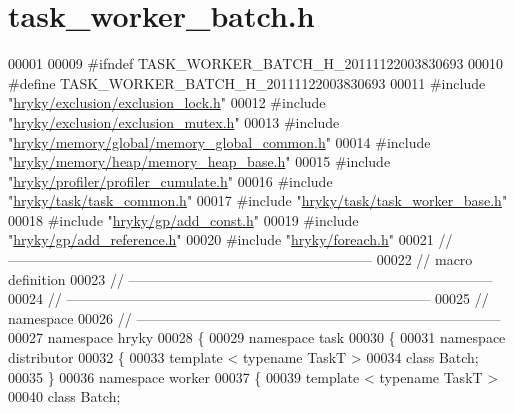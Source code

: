 \hypertarget{task__worker__batch_8h_source}{\section{task\-\_\-worker\-\_\-batch.\-h}
}

\begin{DoxyCode}
00001 
00009 \textcolor{preprocessor}{#ifndef TASK\_WORKER\_BATCH\_H\_20111122003830693}
00010 \textcolor{preprocessor}{}\textcolor{preprocessor}{#define TASK\_WORKER\_BATCH\_H\_20111122003830693}
00011 \textcolor{preprocessor}{}\textcolor{preprocessor}{#include "\hyperlink{exclusion__lock_8h}{hryky/exclusion/exclusion_lock.h}"}
00012 \textcolor{preprocessor}{#include "\hyperlink{exclusion__mutex_8h}{hryky/exclusion/exclusion_mutex.h}"}
00013 \textcolor{preprocessor}{#include "\hyperlink{memory__global__common_8h}{hryky/memory/global/memory_global_common.h}"}
00014 \textcolor{preprocessor}{#include "\hyperlink{memory__heap__base_8h}{hryky/memory/heap/memory_heap_base.h}"}
00015 \textcolor{preprocessor}{#include "\hyperlink{profiler__cumulate_8h}{hryky/profiler/profiler_cumulate.h}"}
00016 \textcolor{preprocessor}{#include "\hyperlink{task__common_8h}{hryky/task/task_common.h}"}
00017 \textcolor{preprocessor}{#include "\hyperlink{task__worker__base_8h}{hryky/task/task_worker_base.h}"}
00018 \textcolor{preprocessor}{#include "\hyperlink{add__const_8h}{hryky/gp/add_const.h}"}
00019 \textcolor{preprocessor}{#include "\hyperlink{add__reference_8h}{hryky/gp/add_reference.h}"}
00020 \textcolor{preprocessor}{#include "\hyperlink{foreach_8h}{hryky/foreach.h}"}
00021 \textcolor{comment}{//
      ------------------------------------------------------------------------------}
00022 \textcolor{comment}{// macro definition}
00023 \textcolor{comment}{//
      ------------------------------------------------------------------------------}
00024 \textcolor{comment}{//
      ------------------------------------------------------------------------------}
00025 \textcolor{comment}{// namespace}
00026 \textcolor{comment}{//
      ------------------------------------------------------------------------------}
00027 \textcolor{keyword}{namespace }hryky
00028 \{
00029 \textcolor{keyword}{namespace }task
00030 \{
00031 \textcolor{keyword}{namespace }distributor
00032 \{
00033     \textcolor{keyword}{template} < \textcolor{keyword}{typename} TaskT >
00034     \textcolor{keyword}{class }Batch;
00035 \}
00036 \textcolor{keyword}{namespace }worker
00037 \{
00039     \textcolor{keyword}{template} < \textcolor{keyword}{typename} TaskT >
00040     \textcolor{keyword}{class }Batch;

\end{DoxyCode}

